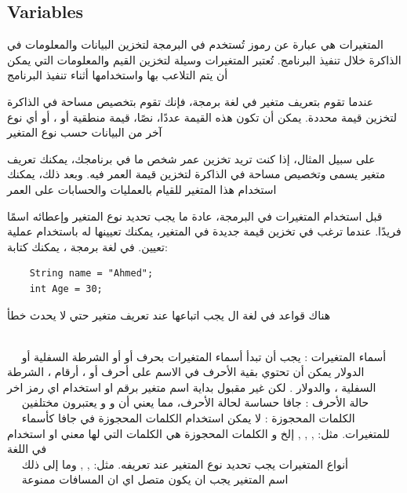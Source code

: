   \subsection{Variables}
  \begin{AR}
    المتغيرات  هي عبارة عن رموز تُستخدم في البرمجة لتخزين البيانات والمعلومات في الذاكرة خلال تنفيذ البرنامج. تُعتبر المتغيرات وسيلة لتخزين القيم والمعلومات التي يمكن أن يتم التلاعب بها واستخدامها أثناء تنفيذ البرنامج

    عندما تقوم بتعريف متغير في لغة برمجة، فإنك تقوم بتخصيص مساحة في الذاكرة لتخزين قيمة محددة. يمكن أن تكون هذه القيمة عددًا، نصًا، قيمة منطقية  أو ، أو أي نوع آخر من البيانات حسب نوع المتغير

    على سبيل المثال، إذا كنت تريد تخزين عمر شخص ما في برنامجك، يمكنك تعريف متغير يسمى  وتخصيص مساحة في الذاكرة لتخزين قيمة العمر فيه. وبعد ذلك، يمكنك استخدام هذا المتغير للقيام بالعمليات والحسابات على العمر

    قبل استخدام المتغيرات في البرمجة، عادة ما يجب تحديد نوع المتغير وإعطائه اسمًا فريدًا. عندما ترغب في تخزين قيمة جديدة في المتغير، يمكنك تعيينها له باستخدام عملية تعيين. في لغة برمجة ، يمكنك كتابة:
  \end{AR}

  \begin{verbatim}
    String name = "Ahmed"; 
    int Age = 30;
  \end{verbatim}

  \begin{AR}
    هناك قواعد في لغة ال  يجب اتباعها عند تعريف متغير حتي لا يحدث خطأ

\\
\ \ \LR{\textcolor{theme}{- 1}}    أسماء المتغيرات : 
يجب أن تبدأ أسماء المتغيرات بحرف  أو  أو الشرطة السفلية \LR{(_)} أو الدولار \LR{(\$)} يمكن أن تحتوي بقية الأحرف في الاسم على أحرف  أو ، أرقام ، الشرطة السفلية \LR{(_)}، والدولار \LR{(\$)}.
لكن غير مقبول بداية اسم متغير برقم او استخدام اي رمز اخر 
\\
\ \ \LR{\textcolor{theme}{- 2}}   حالة الأحرف :
جافا حساسة لحالة الأحرف، مما يعني أن  و  و  يعتبرون مختلفين  
\\
\ \ \LR{\textcolor{theme}{- 3}}    الكلمات المحجوزة :
لا يمكن استخدام الكلمات المحجوزة في جافا كأسماء للمتغيرات. مثل:  ,  ,  , إلخ
و الكلمات المحجوزة هي الكلمات التي لها معني او استخدام في اللغة 
\\
\ \ \LR{\textcolor{theme}{- 4}}    أنواع المتغيرات 
يجب تحديد نوع المتغير عند تعريفه. مثل:  ,  ,   وما إلى ذلك
\\
\ \ \LR{\textcolor{theme}{- 5}} اسم المتغير يجب ان يكون متصل اي ان المسافات ممنوعة
  \end{AR}
